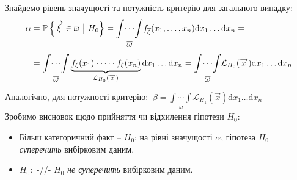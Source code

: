 Знайдемо рівень значущості та потужність критерію для загального випадку:
\[
\begin{split}
\alpha &= \mathbb{P} \left\lbrace  \overrightarrow{\xi} \in \overline{\omega} \ \big| \  H_0 \right\rbrace =
\underset{\begin{gathered}
 \overline{\omega}
\end{gathered}}{ \int\!\cdots\!\int }  f_{\overline{\xi} }(x_1, \dots, x_n) \mathrm{d} x_1 \dots \mathrm{d} x_n =
\\ &=
\underset{\begin{gathered}
 \overline{\omega}
\end{gathered}}{ \int\!\cdots\!\int }   \underbrace{f_{\xi}(x_1) \cdot \dots \cdot f_{\xi}(x_n)}_{\mathcal{L}_{H_0}(\overrightarrow{x})}\mathrm{d} x_1 \dots \mathrm{d} x_n =
\underset{\begin{gathered}
 \overline{\omega}
\end{gathered}}{\int\!\cdots\!\int}
\mathcal{L}_{H_0}(\overrightarrow{x})
\mathrm{d} x_1 \dots \mathrm{d} x_n
\end{split}
\]
Аналогічно, для потужності критерію:
\(
\
\displaystyle
\beta = \underset{\begin{gathered}
 \omega
\end{gathered}}{\int\!\cdots\!\int}
\mathcal{L}_{H_1}(\overrightarrow{x})
\mathrm{d} x_1 \dots \mathrm{d} x_n
\)\\
Зробимо висновок щодо прийняття чи відхилення гіпотези $H_0$:
\begin{itemize}
  \item Більш категоричний факт --  $H_0$: на рівні значущості $\alpha$, гіпотеза $H_0$ \textit{суперечить} вибірковим даним.
  \item \blue{Прийняття} $H_0$:\  -//- $H_0$ \textit{не суперечить} вибірковим даним.
\end{itemize}

